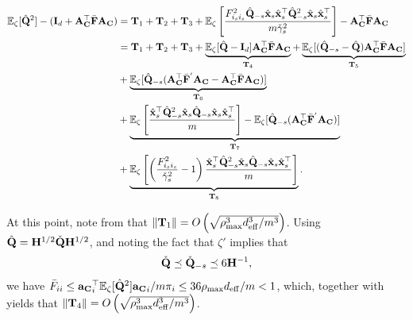 \documentclass[11pt,a4paper]{article}
\begin{document}
\begin{align} 
\EE_{\zeta}[\hat\Q^2] - (\I_d+\A_{\C}^\top\bar\F\A_{\C}) &=\TT_1+\TT_2+\TT_3+\EE_{\zeta}\left[\frac{F_{i_si_s}^2\hat\Q_{-s}\hat\x_s\hat\x_s^\top\hat\Q^2_{-s}\hat\x_s\hat\x_s^\top}{m\check \gamma^2_s}\right]- \A_{\C}^\top\bar\F\A_{\C} \nonumber\\
&=\TT_1+\TT_2+\TT_3+\underbrace{\EE_{\zeta}[\hat\Q-\I_d]\A_{\C}^\top\bar\F\A_{\C}}_{\TT_4}+\underbrace{\EE_{\zeta}[(\hat\Q_{-s}-\hat\Q)\A_{\C}^\top\bar\F\A_{\C}]}_{\TT_5} \nonumber\\
&+\underbrace{\EE_{\zeta}[\hat\Q_{-s}(\A_{\C}^\top\bar\F^{'}\A_{\C}-\A_{\C}^\top\bar\F\A_{\C})]}_{\TT_6} \nonumber \\ 
&+ \underbrace{\EE_{\zeta}\left[\frac{\hat\x_s^\top\hat\Q^2_{-s}\hat\x_s\hat\Q_{-s}\hat\x_s\hat\x_s^\top}{m}\right]-\EE_{\zeta}[\hat\Q_{-s}(\A_{\C}^\top\bar\F^{'}\A_{\C})]}_{\TT_7} \nonumber\\
& +  \underbrace{\EE_{\zeta}\left[\left(\frac{F_{i_si_s}^2}{\check \gamma^2_s}-1\right)\frac{\hat\x_s^\top\hat\Q^2_{-s}\hat\x_s\hat\Q_{-s}\hat\x_s\hat\x_s^\top}{m}\right]}_{\TT_8}\nonumber.
\end{align}

At this point, note from  that $\|\TT_1\|=O\left(\sqrt{\rho_{\max}^3d^3_{\eff}/m^3}\right)$. Using $\hat\Q=\H^{1/2}\check\Q\H^{1/2}$, and noting the fact that  $\zeta'$ implies that   
\begin{align}\label{eq:breve_q_I}
    \check\Q\preceq \check\Q_{-s}\preceq6\H^{-1},   
\end{align}
we have $\bar F_{ii}\leq {\ba_{\C}}^\top_i\EE_{\zeta}[\hat\Q^{2}]{\ba_{\C}}_i/m\pi_i\leq36\rho_{\max} d_{\eff}/m<1$,
which, together with  yields that  $\|\TT_4\|=O\left(\sqrt{\rho_{\max}^3d^3_{\eff}/m^3}\right)$.  
\end{document}

